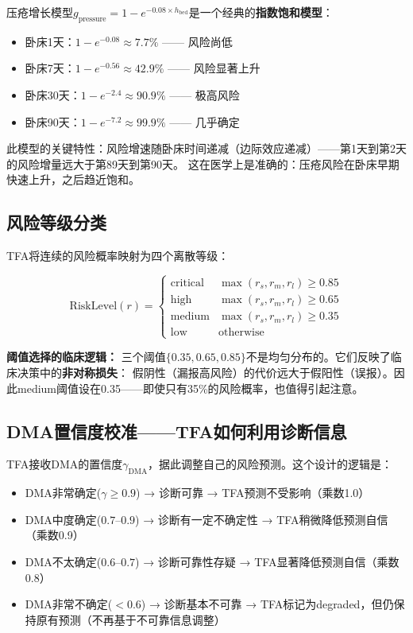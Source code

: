 \documentclass[11pt,a4paper]{ctexart}
\begin{document}
\begin{deepbox}
压疮增长模型$g_{\text{pressure}} = 1 - e^{-0.08 \times h_{\text{bed}}}$是一个经典的\textbf{指数饱和模型}：

\begin{itemize}[nosep]
\item 卧床1天：$1 - e^{-0.08} \approx 7.7\%$ —— 风险尚低
\item 卧床7天：$1 - e^{-0.56} \approx 42.9\%$ —— 风险显著上升
\item 卧床30天：$1 - e^{-2.4} \approx 90.9\%$ —— 极高风险
\item 卧床90天：$1 - e^{-7.2} \approx 99.9\%$ —— 几乎确定
\end{itemize}

此模型的关键特性：风险增速随卧床时间递减（边际效应递减）——第1天到第2天的风险增量远大于第89天到第90天。
这在医学上是准确的：压疮风险在卧床早期快速上升，之后趋近饱和。
\end{deepbox}

\subsection{风险等级分类}

TFA将连续的风险概率映射为四个离散等级：

$$\text{RiskLevel}(r) = \begin{cases}
\text{critical} & \max(r_s, r_m, r_l) \geq 0.85 \\
\text{high} & \max(r_s, r_m, r_l) \geq 0.65 \\
\text{medium} & \max(r_s, r_m, r_l) \geq 0.35 \\
\text{low} & \text{otherwise}
\end{cases}$$

\textbf{阈值选择的临床逻辑：} 三个阈值$\{0.35, 0.65, 0.85\}$不是均匀分布的。它们反映了临床决策中的\textbf{非对称损失}：
假阴性（漏报高风险）的代价远大于假阳性（误报）。因此medium阈值设在0.35——即使只有35\%的风险概率，也值得引起注意。

\subsection{DMA置信度校准——TFA如何利用诊断信息}

TFA接收DMA的置信度$\gamma_{\text{DMA}}$，据此调整自己的风险预测。这个设计的逻辑是：

\begin{itemize}[nosep]
\item DMA非常确定($\gamma \geq 0.9$) → 诊断可靠 → TFA预测不受影响（乘数1.0）
\item DMA中度确定($0.7$--$0.9$) → 诊断有一定不确定性 → TFA稍微降低预测自信（乘数0.9）
\item DMA不太确定($0.6$--$0.7$) → 诊断可靠性存疑 → TFA显著降低预测自信（乘数0.8）
\item DMA非常不确定($<0.6$) → 诊断基本不可靠 → TFA标记为degraded，但仍保持原有预测（不再基于不可靠信息调整）
\end{itemize}
\end{document}
